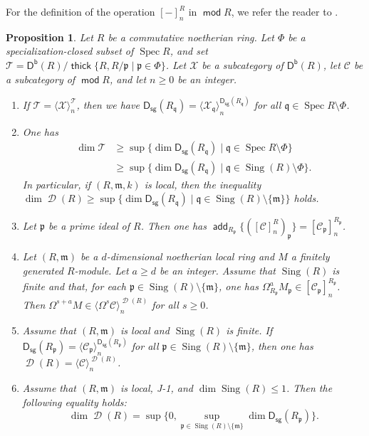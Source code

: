 \documentclass[10pt]{amsart}
\newtheorem{prop}[thm]{Proposition}
\theoremstyle{definition}
\theoremstyle{remark}
\numberwithin{equation}{thm}
\def\add{\operatorname{\mathsf{add}}}
\def\C{\mathcal{C}}
\def\d{\operatorname{\mathscr{D}}}
\def\db{\operatorname{\mathsf{D^b}}}
\def\dim{\operatorname{dim}}
\def\ds{\operatorname{\mathsf{D_{sg}}}}
\def\ge{\geqslant}
\def\le{\leqslant}
\def\m{\mathfrak{m}}
\def\mod{\operatorname{\mathsf{mod}}}
\def\p{\mathfrak{p}}
\def\q{\mathfrak{q}}
\def\Sing{\operatorname{Sing}}
\def\Spec{\operatorname{Spec}}
\def\sup{\operatorname{sup}}
\def\T{\mathcal{T}}
\def\thick{\operatorname{\mathsf{thick}}}
\def\X{\mathcal{X}}
\begin{document}
For the definition of the operation $[-]^{R}_{n}$ in $\mod R$, we refer the reader to \cite{BSTT,DT2014}.
\begin{prop}\label{rdim}
Let $R$ be a commutative noetherian ring.
Let $\Phi$ be a specialization-closed subset of $\Spec R$, and set $\T=\db(R)/\thick\{R,R/\p\mid\p\in\Phi\}$.
Let $\X$ be a subcategory of $\db(R)$, let $\C$ be a subcategory of $\mod R$, and let $n\geq0$ be an integer.
\begin{enumerate}[\rm(1)]
\item
If $\T={\langle\X\rangle}_{n}^{\T}$, then we have  $\ds(R_{\q})={\langle\X_{\q}\rangle}_{n}^{\ds(R_{\q})}$ for all $\q\in\Spec R\setminus\Phi$.
\item
One has
\begin{align*}
\dim\T&\ge\sup\{\dim\ds(R_{\q})\mid\q\in\Spec R\setminus\Phi\} \\
&\ge\sup\{\dim\ds(R_{\q})\mid\q\in\Sing(R)\setminus\Phi\}.
\end{align*}
In particular, if $(R,\m,k)$ is local, then the inequality $\dim\d(R)\ge\sup\{\dim\ds(R_{\q})\mid\q\in\Sing(R)\setminus\{\m\}\}$ holds.
\item
Let $\p$ be a prime ideal of $R$.
Then one has $\add_{R_{\p}}\{({[\C]}_{n}^{R})_{\p}\}={[\C_{\p}]}_{n}^{R_{\p}}$.
\item
Let $(R,\m)$ be a $d$-dimensional noetherian local ring and $M$ a finitely generated $R$-module.
Let $a\ge d$ be an integer.
Assume that $\Sing(R)$ is finite and that, for each $\p\in\Sing(R)\setminus\{\m\}$, one has $\Omega^{a}_{R_{\p}}M_{\p}\in{[\C_{\p}]}_{n}^{R_{\p}}$.
Then $\Omega^{s+a}M\in{\langle\Omega^{s}\C\rangle}_{n}^{\d(R)}$ for all $s\ge0$.
\item
Assume that $(R,\m)$ is local and $\Sing(R)$ is finite.
If $\ds(R_{\p})={\langle\C_{\p}\rangle}_{n}^{\ds(R_{\p})}$ for all $\p\in\Sing(R)\setminus\{\m\}$, then one has $\d(R)={\langle\C\rangle}_{n}^{\d(R)}$.
\item
Assume that $(R,\m)$ is local, J-1, and $\dim\Sing(R)\le1$.
Then the following equality holds:
\[
\dim\d(R)=\sup\{0,\sup_{\p\in\Sing(R)\setminus\{\m\}}\dim\ds(R_{\p})\}.
\]
\end{enumerate}
\end{prop}
\end{document}
